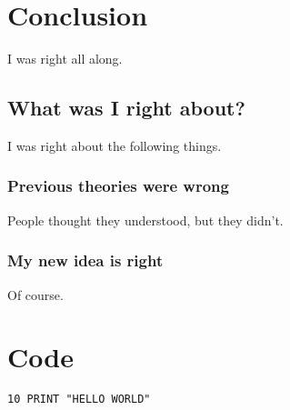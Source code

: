\documentclass[a4paper,12pt]{report}
\begin{document}
\newpage
{}











\chapter{Conclusion}
\label{chap:conc}

I was right all along.

\section{What was I right about?}

I was right about the following things.

\subsection{Previous theories were wrong}

People thought they understood, but they didn't.

\subsection{My new idea is right}

Of course.


\clearpage
{}
{}



\appendix


\chapter{Code}
\label{app:code}

\begin{verbatim}
10 PRINT "HELLO WORLD"
\end{verbatim}


\end{document}

